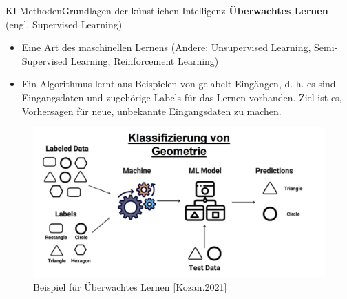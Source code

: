 \documentclass[169, handout	]{THIbeamer} %
\begin{document}
	\begin{frame}{KI-Methoden}{Grundlagen der künstlichen Intelligenz}
		\small	
		\textbf{Überwachtes Lernen} (engl. Supervised Learning)	
		\footnotesize
		\begin{itemize}
			\item Eine Art des maschinellen Lernens (Andere: Unsupervised Learning, Semi-Supervised Learning, Reinforcement Learning)
			\item Ein Algorithmus lernt aus Beispielen von gelabelt Eingängen, d. h. es sind Eingangsdaten und zugehörige Labels
für das Lernen vorhanden. Ziel ist es, Vorhersagen für neue, unbekannte Eingangsdaten zu machen.
		\end{itemize}
		\begin{figure}
			\includegraphics[scale=0.3]{required/supervised_learning.jpg}
			\caption{Beispiel für Überwachtes Lernen [Kozan.2021]}
        	\label{Ground Subtraction}
       	\end{figure}
	\end{frame}
\end{document}
